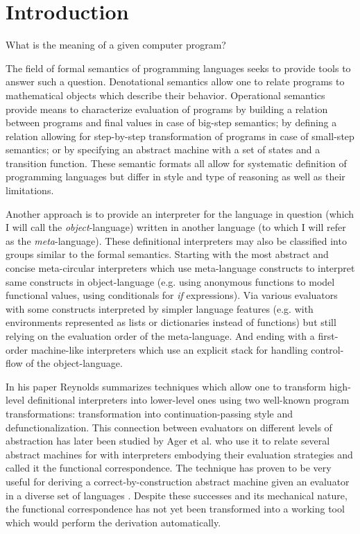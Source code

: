 \chapter{Introduction}\label{chapter:introduction}
What is the meaning of a given computer program?

The field of formal semantics of programming languages seeks to provide tools to answer such a question.
Denotational semantics allow one to relate programs to mathematical objects which describe their behavior.
Operational semantics provide means to characterize evaluation of programs by building a relation between programs and final values in case of big-step semantics; by defining a relation allowing for step-by-step transformation of programs in case of small-step semantics; or by specifying an abstract machine with a set of states and a transition function.
These semantic formats all allow for systematic definition of programming languages but differ in style and type of reasoning as well as their limitations.

Another approach is to provide an interpreter for the language in question (which I will call the \emph{object}-language) written in another language (to which I will refer as the \emph{meta}-language).
These definitional interpreters \cite{reynolds} may also be classified into groups similar to the formal semantics.
Starting with the most abstract and concise meta-circular interpreters which use meta-language constructs to interpret same constructs in object-language (e.g. using anonymous functions to model functional values, using conditionals for \textit{if} expressions).
Via various evaluators with some constructs interpreted by simpler language features (e.g. with environments represented as lists or dictionaries instead of functions) but still relying on the evaluation order of the meta-language.
And ending with a first-order machine-like interpreters which use an explicit stack for handling control-flow of the object-language.

In his paper \cite{reynolds} Reynolds summarizes techniques which allow one to transform high-level definitional interpreters into lower-level ones using two well-known program transformations: transformation into continuation-passing style and defunctionalization.
This connection between evaluators on different levels of abstraction has later been studied by Ager et al.\cite{functional-correspondence} who use it to relate several abstract machines for \LC{} with interpreters embodying their evaluation strategies and called it the functional correspondence.
The technique has proven to be very useful for deriving a correct-by-construction abstract machine given an evaluator in a diverse set of languages \cite{functional-correspondence,biernacki-logic-engine,biernacka-delimited-continuations,ager-monadic-evaluators}.
Despite these successes and its mechanical nature, the functional correspondence has not yet been transformed into a working tool which would perform the derivation automatically.

